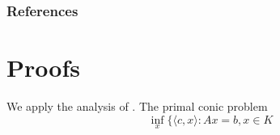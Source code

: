\documentclass[twoside]{article}
\begin{document}
\subsubsection*{References}
\printbibliography


\clearpage
\onecolumn
\appendix
\section{Proofs}

\begin{lproof}\label{proof:main}
    We apply the analysis of \textcite{badenbroek2021algorithm}.
    The primal conic problem
    \[
        \inf_{x} \{\langle c, x\rangle : Ax = b, x \in K \tag{D}
    \]
    
\end{lproof}

\subsection{}
\end{document}
